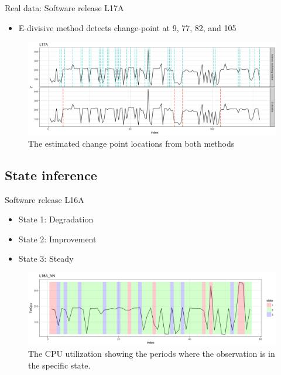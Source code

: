 \documentclass{beamer}
\begin{document}
\begin{frame}
Real data: Software release L17A

\begin{itemize}
	\item E-divisive method detects change-point at 9, 77, 82, and 105
\end{itemize}

\begin{figure}
	\includegraphics[width=1\linewidth]{compare_L17A}
	\caption{The estimated change point locations from both methods}
\end{figure}
\end{frame}

\subsection{State inference}
\begin{frame}
Software release L16A

\begin{itemize}
	\item State 1: Degradation
	\item State 2: Improvement
	\item State 3: Steady
\end{itemize}

\begin{figure}
	\includegraphics[width=1\linewidth]{L16A_NN1}
	\caption{The CPU utilization showing the periods where the observation is in the specific state.}
\end{figure}

\end{frame}
\end{document}
